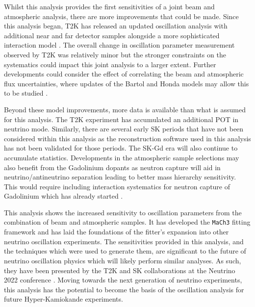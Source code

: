 Whilst this analysis provides the first sensitivities of a joint beam and atmospheric analysis, there are more improvements that could be made. Since this analysis began, T2K has released an updated oscillation analysis with additional near and far detector samples alongside a more sophisticated interaction model \cite{Bronner2022-wd}. The overall change in oscillation parameter measurement observed by T2K was relatively minor but the stronger constraints on the systematics could impact this joint analysis to a larger extent.
Further developments could consider the effect of correlating the beam and atmospheric flux uncertainties, where updates of the Bartol and Honda models may allow this to be studied \cite{Sato2022-ss}.

Beyond these model improvements, more data is available than what is assumed for this analysis. The T2K experiment has accumulated an additional POT in neutrino mode. Similarly, there are several early SK periods that have not been considered within this analysis as the reconstruction software used in this analysis has not been validated for those periods. The SK-Gd era will also continue to accumulate statistics. Developments in the atmospheric sample selections may also benefit from the Gadolinium dopants as neutron capture will aid in neutrino/antineutrino separation leading to better mass hierarchy sensitivity. This would require including interaction systematics for neutron capture of Gadolinium which has already started \cite{10.48550/arxiv.2209.08609}.

This analysis shows the increased sensitivity to oscillation parameters from the combination of beam and atmospheric samples. It has developed the \texttt{MaCh3} fitting framework and has laid the foundations of the fitter's expansion into other neutrino oscillation experiments. The sensitivities provided in this analysis, and the techniques which were used to generate them, are significant to the future of neutrino oscillation physics which will likely perform similar analyses. As such, they have been presented by the T2K and SK collaborations at the Neutrino 2022 conference \cite{Bronner2022-wd}. Moving towards the next generation of neutrino experiments, this analysis has the potential to become the basis of the oscillation analysis for future Hyper-Kamiokande experiments.


